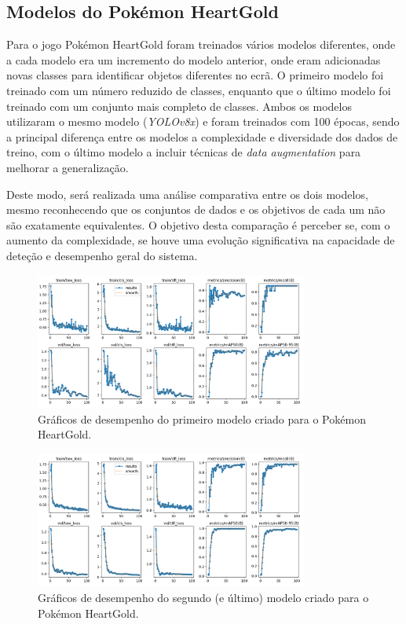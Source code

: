 %
%
\subsection{Modelos do Pokémon HeartGold}
Para o jogo Pokémon HeartGold foram treinados vários modelos diferentes, onde a cada modelo era um incremento do modelo anterior, onde eram adicionadas novas classes para identificar objetos diferentes no ecrã. O primeiro modelo foi treinado com um número reduzido de classes, enquanto que o último modelo foi treinado com um conjunto mais completo de classes. Ambos os modelos utilizaram o mesmo modelo (\textit{YOLOv8x}) e foram treinados com 100 épocas, sendo a principal diferença entre os modelos a complexidade e diversidade dos dados de treino, com o último modelo a incluir técnicas de \textit{data augmentation} para melhorar a generalização.

Deste modo, será realizada uma análise comparativa entre os dois modelos, mesmo reconhecendo que os conjuntos de dados e os objetivos de cada um não são exatamente equivalentes. O objetivo desta comparação é perceber se, com o aumento da complexidade, se houve uma evolução significativa na capacidade de deteção e desempenho geral do sistema.

\begin{figure}[h]
    \centering
    \includegraphics[width=0.80\textwidth]{imagens/results_primeiro_modelo.png}
    \caption{Gráficos de desempenho do primeiro modelo criado para o Pokémon HeartGold.}
    \label{fig:results_primeiro_modelo}
\end{figure}

\begin{figure}[h]
    \centering
    \includegraphics[width=0.80\textwidth]{imagens/results_ultimo_modelo.png}
    \caption{Gráficos de desempenho do segundo (e último) modelo criado para o Pokémon HeartGold.}
    \label{fig:results_ultimo_modelo}
\end{figure}

